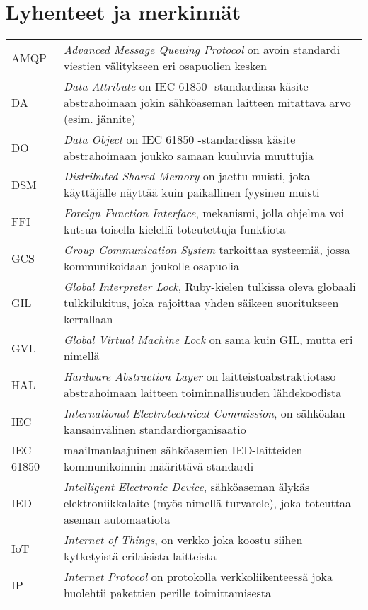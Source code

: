 \chapter*{Lyhenteet ja merkinnät}
\label{ch:lyhenteetjamerkinnat}
\begin{tabularx}{\linewidth}[h]{@{} p{} p{} @{}}
	AMQP & \emph{Advanced Message Queuing Protocol} on avoin standardi viestien välitykseen eri osapuolien kesken \\
	DA & \emph{Data Attribute} on IEC 61850 -standardissa käsite abstrahoimaan jokin sähköaseman laitteen mitattava arvo (esim. jännite) \\
	DO & \emph{Data Object} on IEC 61850 -standardissa käsite abstrahoimaan joukko samaan kuuluvia muuttujia \\
	DSM & \emph{Distributed Shared Memory} on jaettu muisti, joka käyttäjälle näyttää kuin paikallinen fyysinen muisti \\
	FFI & \emph{Foreign Function Interface}, mekanismi, jolla ohjelma voi kutsua toisella kielellä toteutettuja funktiota \\
	GCS & \emph{Group Communication System} tarkoittaa systeemiä, jossa kommunikoidaan joukolle osapuolia \\
	GIL & \emph{Global Interpreter Lock}, Ruby-kielen tulkissa oleva globaali tulkkilukitus, joka rajoittaa yhden säikeen suoritukseen kerrallaan \\
	GVL & \emph{Global Virtual Machine Lock} on sama kuin GIL, mutta eri nimellä \\
	HAL & \emph{Hardware Abstraction Layer} on laitteistoabstraktiotaso abstrahoimaan laitteen toiminnallisuuden lähdekoodista \\
	IEC & \emph{International Electrotechnical Commission}, on sähköalan kansainvälinen standardiorganisaatio \\
	IEC 61850 & maailmanlaajuinen sähköasemien IED-laitteiden kommunikoinnin määrittävä standardi \\
	IED & \emph{Intelligent Electronic Device}, sähköaseman älykäs elektroniikkalaite (myös nimellä turvarele), joka toteuttaa aseman automaatiota \\
	IoT & \emph{Internet of Things}, on verkko joka koostu siihen kytketyistä erilaisista laitteista \\
	IP & \emph{Internet Protocol} on protokolla verkkoliikenteessä joka huolehtii pakettien perille toimittamisesta \\

\end{tabularx}

